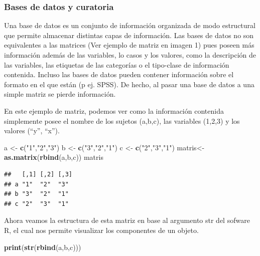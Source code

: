 \documentclass[
  14pt,
]{book}
\newenvironment{Shaded}{\begin{snugshade}}{\end{snugshade}}
\newcommand{\KeywordTok}[1]{\textcolor[rgb]{0.13,0.29,0.53}{\textbf{#1}}}
\newcommand{\NormalTok}[1]{#1}
\newcommand{\StringTok}[1]{\textcolor[rgb]{0.31,0.60,0.02}{#1}}
\begin{document}
\hypertarget{bases-de-datos-y-curatoria}{%
\subsubsection{Bases de datos y curatoria}\label{bases-de-datos-y-curatoria}}

Una base de datos es un conjunto de información organizada de modo estructural que permite almacenar distintas capas de información. Las bases de datos no son equivalentes a las matrices (Ver ejemplo de matriz en imagen 1) pues poseen más información además de las variables, lo casos y los valores, como la descripción de las variables, las etiquetas de las categorías o el tipo-clase de información contenida. Incluso las bases de datos pueden contener información sobre el formato en el que están (p ej. SPSS). De hecho, al pasar una base de datos a una simple matriz se pierde información.

En este ejemplo de matriz, podemos ver como la información contenida simplemente posee el nombre de los sujetos (a,b,c), las variables (1,2,3) y los valores (``y'', ``x'').

\begin{Shaded}
\begin{Highlighting}[]
\NormalTok{a <-}\StringTok{ }\KeywordTok{c}\NormalTok{(}\StringTok{"1"}\NormalTok{,}\StringTok{"2"}\NormalTok{,}\StringTok{"3"}\NormalTok{)}
\NormalTok{b <-}\StringTok{ }\KeywordTok{c}\NormalTok{(}\StringTok{"3"}\NormalTok{,}\StringTok{"2"}\NormalTok{,}\StringTok{"1"}\NormalTok{)}
\NormalTok{c <-}\StringTok{ }\KeywordTok{c}\NormalTok{(}\StringTok{"2"}\NormalTok{,}\StringTok{"3"}\NormalTok{,}\StringTok{"1"}\NormalTok{)}
\NormalTok{matris<-}\KeywordTok{as.matrix}\NormalTok{(}\KeywordTok{rbind}\NormalTok{(a,b,c))}
\NormalTok{matris}
\end{Highlighting}
\end{Shaded}

\begin{verbatim}
##   [,1] [,2] [,3]
## a "1"  "2"  "3" 
## b "3"  "2"  "1" 
## c "2"  "3"  "1"
\end{verbatim}

Ahora veamos la estructura de esta matriz en base al argumento str del sofware R, el cual nos permite visualizar los componentes de un objeto.

\begin{Shaded}
\begin{Highlighting}[]
\KeywordTok{print}\NormalTok{(}\KeywordTok{str}\NormalTok{(}\KeywordTok{rbind}\NormalTok{(a,b,c)))}
\end{Highlighting}
\end{Shaded}
\end{document}
